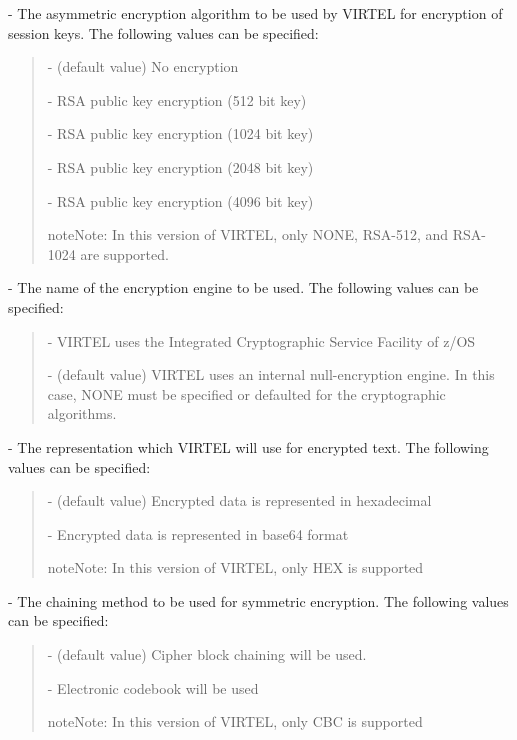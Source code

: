 \documentclass[letterpaper,10pt,english]{sphinxmanual}
\begin{document}
 - The asymmetric encryption algorithm to be used by VIRTEL for encryption of session keys. The following values can be specified:
\begin{quote}

 - (default value) No encryption

 - RSA public key encryption (512 bit key)

 - RSA public key encryption (1024 bit key)

 - RSA public key encryption (2048 bit key)

 - RSA public key encryption (4096 bit key)

\begin{sphinxadmonition}{note}{Note:}
In this version of VIRTEL, only NONE, RSA-512, and RSA-1024 are supported.
\end{sphinxadmonition}
\end{quote}

 - The name of the encryption engine to be used. The following values can be specified:
\begin{quote}

 - VIRTEL uses the Integrated Cryptographic Service Facility of z/OS

 - (default value) VIRTEL uses an internal null-encryption engine. In this case, NONE must be specified or defaulted for the cryptographic algorithms.
\end{quote}

 - The representation which VIRTEL will use for encrypted text. The following values can be specified:
\begin{quote}

 - (default value) Encrypted data is represented in hexadecimal

 - Encrypted data is represented in base64 format

\begin{sphinxadmonition}{note}{Note:}
In this version of VIRTEL, only HEX is supported
\end{sphinxadmonition}
\end{quote}

 - The chaining method to be used for symmetric encryption. The following values can be specified:
\begin{quote}

 - (default value) Cipher block chaining will be used.

 - Electronic codebook will be used

\begin{sphinxadmonition}{note}{Note:}
In this version of VIRTEL, only CBC is supported
\end{sphinxadmonition}
\end{quote}
\end{document}
